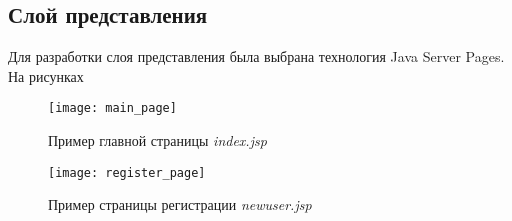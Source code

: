 \subsection{Слой представления}
Для разработки слоя представления была выбрана технология Java Server Pages.
На рисунках 
	\begin{figure}[H]
		\centering
		\texttt{[image: main\_page]}
		\caption{Пример главной страницы \textit{index.jsp}}
		\label{fig:main}
	\end{figure}
	\begin{figure}[H]
		\centering
		\texttt{[image: register\_page]}
		\caption{Пример страницы регистрации \textit{newuser.jsp}}
		\label{fig:register}
	\end{figure}
